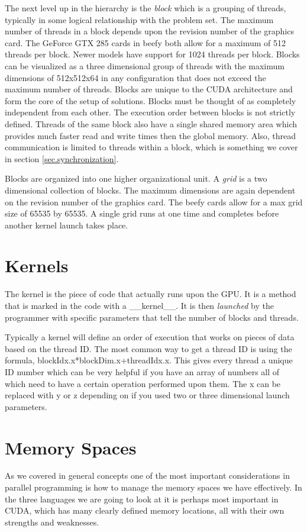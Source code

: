 \documentclass{article}
\newcommand{\comp}[1]{{\ttfamily #1}}
\begin{document}
    The next level up in the hierarchy is the \emph{block} which is a grouping of threads, typically in some logical relationship with the problem set. The maximum number of threads in a block depends upon the revision number of the graphics card. The GeForce GTX 285 cards in beefy both allow for a maximum of 512 threads per block. Newer models have support for 1024 threads per block. Blocks can be visualized as a three dimensional group of threads with the maximum dimensions of 512x512x64 in any configuration that does not exceed the maximum number of threads. Blocks are unique to the CUDA architecture and form the core of the setup of solutions. Blocks must be thought of as completely independent from each other. The execution order between blocks is not strictly defined. Threads of the same block also have a single shared memory area which provides much faster read and write times then the global memory. Also, thread communication is limited to threads within a block, which is something we cover in section \ref{sec.synchronization}.

    Blocks are organized into one higher organizational unit. A \emph{grid} is a two dimensional collection of blocks. The maximum dimensions are again dependent on the revision number of the graphics card. The beefy cards allow for a max grid size of 65535 by 65535. A single grid runs at one time and completes before another kernel launch takes place.
	
	\section{Kernels}
    The kernel is the piece of code that actually runs upon the GPU. It is a method that is marked in the code with a \comp{\_\_kernel\_\_}. It is then \emph{launched} by the programmer with specific parameters that tell the number of blocks and threads.

    Typically a kernel will define an order of execution that works on pieces of data based on the thread ID. The most common way to get a thread ID is using the formula, \comp{blockIdx.x*blockDim.x+threadIdx.x}. This gives every thread a unique ID number which can be very helpful if you have an array of numbers all of which need to have a certain operation performed upon them. The \comp{x} can be replaced with \comp{y} or \comp{z} depending on if you used two or three dimensional launch parameters.

    \section{Memory Spaces}
    As we covered in general concepts one of the most important considerations in parallel programming is how to manage the memory spaces we have effectively. In the three languages we are going to look at it is perhaps most important in CUDA, which has many clearly defined memory locations, all with their own strengths and weaknesses.
\end{document}
